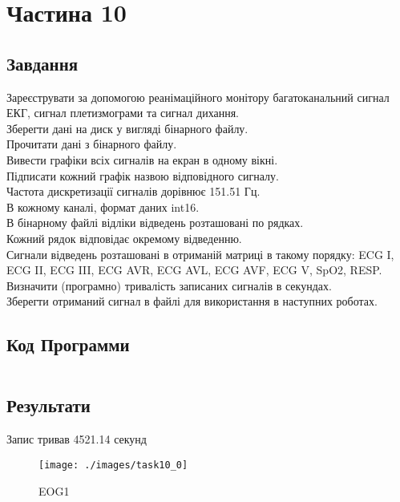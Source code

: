 \section{Частина 10}
\label{sec:task10}

\subsection{Завдання}
\label{subsec:task10_task}

Зареєструвати за допомогою реанімаційного монітору багатоканальний сигнал ЕКГ,
сигнал плетизмограми та сигнал дихання. \\
Зберегти дані на диск у вигляді бінарного файлу. \\
Прочитати дані з бінарного файлу. \\
Вивести графіки всіх сигналів на екран в одному вікні. \\
Підписати кожний графік назвою відповідного сигналу. \\
Частота дискретизації сигналів дорівнює 151.51 Гц. \\
В кожному каналі, формат даних int16. \\
В бінарному файлі відліки відведень розташовані по рядках. \\
Кожний рядок відповідає окремому відведенню. \\
Сигнали відведень розташовані в отриманій матриці в такому порядку:
ECG I, ECG II, ECG III, ECG AVR, ECG AVL, ECG AVF, ECG V, SpO2, RESP. \\
Визначити (програмно) тривалість записаних сигналів в секундах. \\
Зберегти отриманий сигнал в файлі для використання в наступних роботах.

\subsection{Код Программи}
\label{subsec:task10_code}
\inputminted{python}{../src/task10.py}

\subsection{Результати}
\label{subsec:task10_results}

Запис тривав 4521.14 секунд

\begin{figure}[!ht]
    \centering
    \texttt{[image: ./images/task10\_0]}
    \caption{EOG1}
    \label{fig:task10_eog1}
\end{figure}

